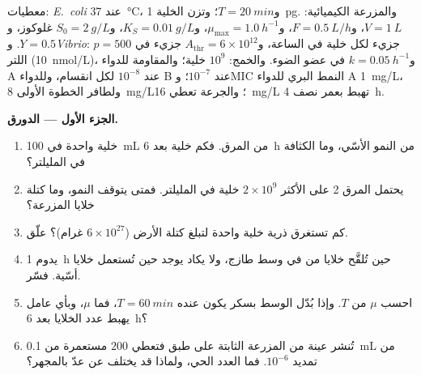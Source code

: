 \begin{problem}
\label{pb:b3:bacteriology:1}
معطيات: \emph{E.~coli} عند \qty{37}{\celsius}، و$T = \qty{20}{min}$؛ وتزن الخلية
\qty{1}{pg}. والمزرعة الكيميائية: $V = \qty{1}{L}$، و$F = \qty{0.5}{L/h}$،
و$\mu_{\max} = \qty{1.0}{h^{-1}}$، و$K_{S} = \qty{0.01}{g/L}$، و$S_{0} =
\qty{2}{g/L}$ غلوكوز، و$Y = 0.5$. و\emph{Vibrio}: $p = 500$ جزيء
 لكل خلية في الساعة، و$A_{\text{thr}} = 6\times 10^{12}$
جزيء في اللتر (\qty{10}{nmol/L})، و$k = \qty{0.05}{h^{-1}}$ في
عضو الضوء. والخمج: $10^{9}$ خلية؛ والمقاومة للدواء A عند
$10^{-8}$ لكل انقسام، وللدواء B عند $10^{-7}$؛ وMIC النمط البري للدواء A
\qty{1}{mg/L}، ولطافر الخطوة الأولى \qty{8}{mg/L}؛ والجرعة تعطي
\qty{16}{mg/L} تهبط بعمر نصف \qty{4}{h}.

\medskip
\noindent\textbf{الجزء الأول --- الدورق.}
\begin{enumerate}
  \item خلية واحدة في \qty{100}{mL} من المرق. فكم خلية بعد
        \qty{6}{h} من النمو الأسّي، وما الكثافة في المليلتر؟
  \item يحتمل المرق \qty{2}{} على الأكثر $2\times 10^{9}$ خلية في المليلتر. فمتى
        يتوقف النمو، وما كتلة خلايا المزرعة؟
  \item كم تستغرق ذرية خلية واحدة لتبلغ
        كتلة الأرض ($6\times 10^{27}$ غرام)؟ علّق.
  \item يدوم  \qty{1}{h} حين تُلقَّح خلايا من 
        في وسط طازج، ولا يكاد يوجد حين تُستعمل خلايا
        أسّية. فسّر.
  \item احسب $\mu$ من $T$. وإذا بُدّل الوسط بسكر يكون عنده
        $T = \qty{60}{min}$، فما $\mu$، وبأي عامل
        يهبط عدد الخلايا بعد \qty{6}{h}؟
  \item تُنشر عينة من المزرعة الثابتة على طبق فتعطي
        $200$ مستعمرة من \qty{0.1}{mL} من تمديد $10^{-6}$.
        فما العدد الحي، ولماذا قد يختلف عن عدّ بالمجهر؟
\end{enumerate}


\end{problem}
